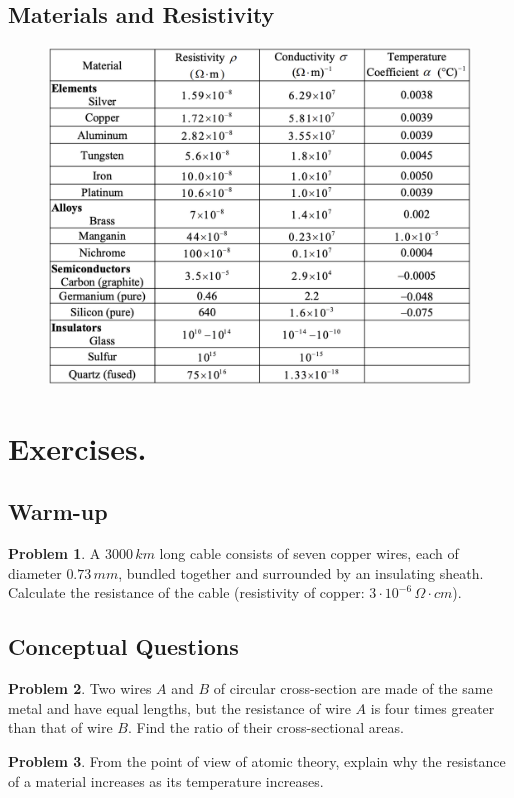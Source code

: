 \documentclass[11pt, letterpaper]{article}
\begin{document}
\subsection{Materials and Resistivity}
\begin{figure}[h!]
	\centering
	\includegraphics[scale=0.6]{resistivity.png}
\end{figure}

\newpage
\section{Exercises.}
\subsection{Warm-up}
\textbf{Problem 1}. A $3000\, km$ long cable consists of seven copper wires, each of diameter $0.73\, mm$, bundled together and surrounded by an insulating sheath. Calculate the resistance of the cable (resistivity of copper: $3\cdot 10^{-6}\,\Omega\cdot cm$).

\subsection{Conceptual Questions}
\textbf{Problem 2}. Two wires $A$ and $B$ of circular cross-section are made of the same metal and have equal lengths, but the resistance of wire $A$ is four times greater than that of wire $B$. Find the ratio of their cross-sectional areas.

\textbf{Problem 3}. From the point of view of atomic theory, explain why the resistance of a material increases as its temperature increases.
\end{document}

